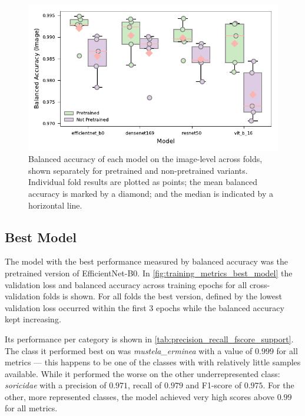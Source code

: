     

    \begin{figure}[ht]
    \centering
    \includegraphics{figures/bal_acc_img.pdf}
    \caption{Balanced accuracy of each model on the image-level across folds, shown separately for pretrained and non-pretrained variants. Individual fold results are plotted as points; the mean balanced accuracy is marked by a diamond; and the median is indicated by a horizontal line.}
    \label{fig:bal_acc_img}
    \end{figure}

    \subsection{Best Model}

    The model with the best performance measured by balanced accuracy was the pretrained version of EfficientNet-B0.
    In \autoref{fig:training_metrics_best_model} the validation loss and balanced accuracy across training epochs for all cross-validation folds is shown.
    For all folds the best version, defined by the lowest validation loss occurred within the first 3 epochs while the balanced accuracy kept increasing.

    Its performance per category is shown in \autoref{tab:precision_recall_fscore_support}.
    The class it performed best on was \textit{mustela\_erminea} with a value of \(0.999\) for all metrics --- this happens to be one of the classes with with relatively little samples available.
    While it performed the worse on the other underrepresented class: \textit{soricidae} with a precision of \(0.971\), recall of \(0.979\) and F1-score of \(0.975\).
    For the other, more represented classes, the model achieved very high scores above \(0.99\) for all metrics.

